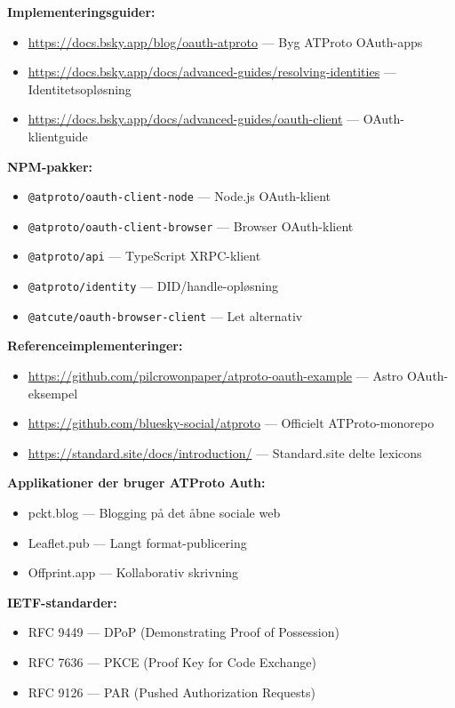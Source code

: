 \documentclass[10pt,letterpaper,twocolumn]{article}
\begin{document}
\textbf{Implementeringsguider:}
\begin{itemize}
  \item \url{https://docs.bsky.app/blog/oauth-atproto} --- Byg ATProto OAuth-apps
  \item \url{https://docs.bsky.app/docs/advanced-guides/resolving-identities} --- Identitetsopløsning
  \item \url{https://docs.bsky.app/docs/advanced-guides/oauth-client} --- OAuth-klientguide
\end{itemize}

\textbf{NPM-pakker:}
\begin{itemize}
  \item \texttt{@atproto/oauth-client-node} --- Node.js OAuth-klient
  \item \texttt{@atproto/oauth-client-browser} --- Browser OAuth-klient
  \item \texttt{@atproto/api} --- TypeScript XRPC-klient
  \item \texttt{@atproto/identity} --- DID/handle-opløsning
  \item \texttt{@atcute/oauth-browser-client} --- Let alternativ
\end{itemize}

\textbf{Referenceimplementeringer:}
\begin{itemize}
  \item \url{https://github.com/pilcrowonpaper/atproto-oauth-example} --- Astro OAuth-eksempel
  \item \url{https://github.com/bluesky-social/atproto} --- Officielt ATProto-monorepo
  \item \url{https://standard.site/docs/introduction/} --- Standard.site delte lexicons
\end{itemize}

\textbf{Applikationer der bruger ATProto Auth:}
\begin{itemize}
  \item pckt.blog --- Blogging på det åbne sociale web
  \item Leaflet.pub --- Langt format-publicering
  \item Offprint.app --- Kollaborativ skrivning
\end{itemize}

\textbf{IETF-standarder:}
\begin{itemize}
  \item RFC 9449 --- DPoP (Demonstrating Proof of Possession)
  \item RFC 7636 --- PKCE (Proof Key for Code Exchange)
  \item RFC 9126 --- PAR (Pushed Authorization Requests)
\end{itemize}

\vspace{0.5em}



\end{document}
